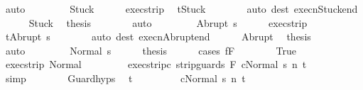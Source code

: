 \begin{isabellebody}
\ auto\isanewline
\ \ \isamarkupfalse%
\isanewline
\ \ \ \ \isamarkupfalse%
\ Stuck\isanewline
\ \ \ \ \isamarkupfalse%
\ exec{\isacharunderscore}strip\ \isamarkupfalse%
\ {\isachardoublequoteopen}t{\isacharequal}Stuck{\isachardoublequoteclose}\isanewline
\ \ \ \ \ \ \isamarkupfalse%
\ {\isacharparenleft}auto\ dest{\isacharcolon}\ execn{\isacharunderscore}Stuck{\isacharunderscore}end{\isacharparenright}\isanewline
\ \ \ \ \isamarkupfalse%
\ Stuck\ \isamarkupfalse%
\ {\isacharquery}thesis\isanewline
\ \ \ \ \ \ \isamarkupfalse%
\ auto\isanewline
\ \ \isamarkupfalse%
\isanewline
\ \ \ \ \isamarkupfalse%
\ {\isacharparenleft}Abrupt\ s{\isacharprime}{\isacharparenright}\isanewline
\ \ \ \ \isamarkupfalse%
\ exec{\isacharunderscore}strip\ \isamarkupfalse%
\ {\isachardoublequoteopen}t{\isacharequal}Abrupt\ s{\isacharprime}{\isachardoublequoteclose}\isanewline
\ \ \ \ \ \ \isamarkupfalse%
\ {\isacharparenleft}auto\ dest{\isacharcolon}\ execn{\isacharunderscore}Abrupt{\isacharunderscore}end{\isacharparenright}\isanewline
\ \ \ \ \isamarkupfalse%
\ Abrupt\ \isamarkupfalse%
\ {\isacharquery}thesis\isanewline
\ \ \ \ \ \ \isamarkupfalse%
\ auto\isanewline
\ \ \isamarkupfalse%
\isanewline
\ \ \ \ \isamarkupfalse%
\ {\isacharparenleft}Normal\ s{\isacharprime}{\isacharparenright}\isanewline
\ \ \ \ \isamarkupfalse%
\ {\isacharquery}thesis\isanewline
\ \ \ \ \isamarkupfalse%
\ {\isacharparenleft}cases\ {\isachardoublequoteopen}f{\isasymin}F{\isachardoublequoteclose}{\isacharparenright}\isanewline
\ \ \ \ \ \ \isamarkupfalse%
\ True\isanewline
\ \ \ \ \ \ \isamarkupfalse%
\ exec{\isacharunderscore}strip\ Normal\ \isanewline
\ \ \ \ \ \ \isamarkupfalse%
\ exec{\isacharunderscore}strip{\isacharunderscore}c{\isacharcolon}\ {\isachardoublequoteopen}{\isasymGamma}{\isasymturnstile}{\isasymlangle}strip{\isacharunderscore}guards\ F\ c{\isacharcomma}Normal\ s{\isacharprime}{\isasymrangle}\ {\isacharequal}n{\isasymRightarrow}\ t{\isachardoublequoteclose}\isanewline
\ \ \ \ \ \ \ \ \isamarkupfalse%
\ simp\isanewline
\ \ \ \ \ \ \isamarkupfalse%
\ Guard{\isachardot}hyps\ \isamarkupfalse%
\ t{\isacharprime}\ \isanewline
\ \ \ \ \ \ \ \ {\isachardoublequoteopen}{\isasymGamma}{\isasymturnstile}{\isasymlangle}c{\isacharcomma}Normal\ s{\isacharprime}{\isasymrangle}\ {\isacharequal}n{\isasymRightarrow}\ t{\isacharprime}{\isachardoublequoteclose}\ \isanewline

\end{isabellebody}
